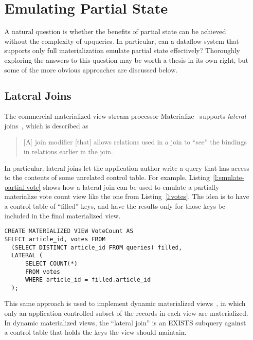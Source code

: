 \section{Emulating Partial State}
\label{s:disc:emulating}

A natural question is whether the benefits of partial state can be achieved
without the complexity of upqueries. In particular, can a dataflow system that
supports only full materialization emulate partial state effectively? Thoroughly
exploring the answers to this question may be worth a thesis in its own right,
but some of the more obvious approaches are discussed below.

\subsection{Lateral Joins}

The commercial materialized view stream processor Materialize~\cite{materialize}
supports \emph{lateral} joins~\cite{lateral-join}, which is described as

\begin{quote}
  [A] join modifier [that] allows relations used in a join to ``see'' the
  bindings in relations earlier in the join.
\end{quote}

In particular, lateral joins let the application author write a query that has
access to the contents of some unrelated control table. For example,
Listing~\vref{l:emulate-partial-vote} shows how a lateral join can be used to
emulate a partially materialize vote count view like the one from
Listing~\vref{l:votes}. The idea is to have a control table of ``filled'' keys,
and have the results only for those keys be included in the final materialized
view.

\begin{listing}[h]
  \begin{verbatim}
CREATE MATERIALIZED VIEW VoteCount AS
SELECT article_id, votes FROM
  (SELECT DISTINCT article_id FROM queries) filled,
  LATERAL (
      SELECT COUNT(*)
      FROM votes
      WHERE article_id = filled.article_id
  );
  \end{verbatim}
  \caption{Using a Materialize lateral join to emulate partial state in vote.}
  \label{l:emulate-partial-vote}
\end{listing}

This same approach is used to implement dynamic materialized
views~\cite{dynamic-materialized-views, partially-materialized-views}, in which
only an application-controlled subset of the records in each view are
materialized. In dynamic materialized views, the ``lateral join'' is an EXISTS
subquery against a control table that holds the keys the view should maintain.

